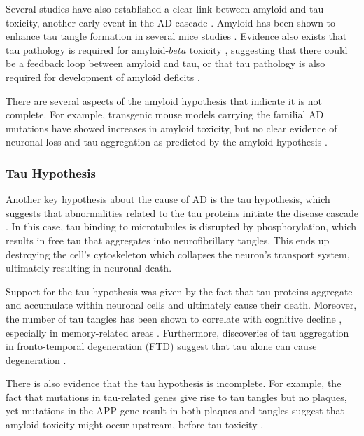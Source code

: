 Several studies have also established a clear link between amyloid and tau toxicity, another early event in the AD cascade \cite{gotz2001formation, lewis2001enhanced, roberson2007reducing, bloom2014amyloid}. Amyloid has been shown to enhance tau tangle formation in several mice studies \cite{gotz2001formation,lewis2001enhanced}. Evidence also exists that tau pathology is required for amyloid-$beta$ toxicity \cite{roberson2007reducing}, suggesting that there could be a feedback loop between amyloid and tau, or that tau pathology is also required for development of amyloid deficits \cite{bloom2014amyloid}. 

There are several aspects of the amyloid hypothesis that indicate it is not complete. For example, transgenic mouse models carrying the familial AD mutations have showed increases in amyloid toxicity, but no clear evidence of neuronal loss \cite{hsiao1995age,irizarry1997appsw} and tau aggregation as predicted by the amyloid hypothesis \cite{bloom2014amyloid}.

\subsubsection{Tau Hypothesis}
\label{sec:bckTauHyp}

Another key hypothesis about the cause of AD is the tau hypothesis, which  suggests that abnormalities related to the tau proteins initiate the disease cascade \cite{mudher2002alzheimer}. In this case, tau binding to microtubules is disrupted by phosphorylation, which results in free tau that aggregates into neurofibrillary tangles. This ends up destroying the cell's cytoskeleton which collapses the neuron's transport system, ultimately resulting in neuronal death. 

Support for the tau hypothesis was given by the fact that tau proteins aggregate and accumulate within neuronal cells and ultimately cause their death. Moreover, the number of tau tangles has been shown to correlate with cognitive decline \cite{nagy1995relative}, especially in memory-related areas \cite{braak1998evolution,braak1994sequence}. Furthermore, discoveries of tau aggregation in fronto-temporal degeneration (FTD) suggest that tau alone can cause degeneration \cite{heutink2000untangling}.  

There is also evidence that the tau hypothesis is incomplete. For example, the fact that mutations in tau-related genes give rise to tau tangles but no plaques, yet mutations in the APP gene result in both plaques and tangles suggest that amyloid toxicity might occur upstream, before tau toxicity \cite{mudher2002alzheimer}. 


